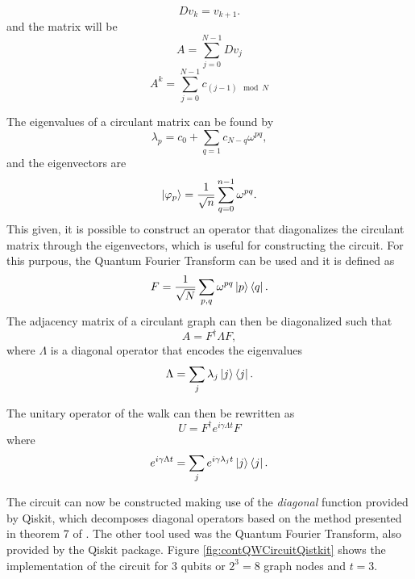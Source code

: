 \documentclass[../../dissertation.tex]{subfiles}
\begin{document}
\begin{equation}
    Dv_k = v_{k+1}.
\end{equation}
and the matrix will be
\begin{equation}
	A = \sum_{j=0}^{N-1} D v_j 
\end{equation}
\begin{equation}
	A^k = \sum_{j=0}^{N-1} c_{(j-1)\mod{N}}
\end{equation}\par
The eigenvalues of a circulant matrix can be found by
\begin{equation}
\lambda_p = c_0 + \sum_{q=1} c_{N-q} \omega^{pq},
\end{equation}
and the eigenvectors are 
\begin{equation}
\ket{\varphi_p} = \frac{1}{\sqrt{n}} \sum_{q=0}^{n-1} \omega^{pq}.
\end{equation}
This given, it is possible to construct an operator that diagonalizes the circulant matrix through the eigenvectors, which is useful for constructing the circuit. For this purpous, the Quantum Fourier Transform can be used and it is defined as 
\begin{equation}
F = \frac{1}{\sqrt{N}} \sum_{p,q} \omega^{pq} \ket{p}\bra{q}.
\end{equation}
The adjacency matrix of a circulant graph can then be diagonalized such that
\begin{equation}
    A = F^{\dagger} \Lambda F,
    \label{eq:qiskitContQWAdj}
\end{equation}
where $\Lambda$ is a diagonal operator that encodes the eigenvalues
\begin{equation}
\Lambda = \sum_{j} \lambda_j \ket{j}\bra{j}.
\end{equation}\par
The unitary operator of the walk can then be rewritten as
\begin{equation}\label{eq:diagUniOpCont}
    U = F^{\dagger}e^{i\gamma \Lambda t} F
\end{equation}
where
\begin{equation}
    e^{i\gamma \Lambda t} = \sum_{j} e^{i\gamma \lambda_j t} \ket{j}\bra{j}.
\end{equation}\par
The circuit can now be constructed making use of the \textit{diagonal} function provided by Qiskit, which decomposes diagonal operators based on the method presented in theorem 7 of \cite{Shende06}. The other tool used was the Quantum Fourier Transform, also provided by the Qiskit package. Figure \ref{fig:contQWCircuitQistkit} shows the implementation of the circuit for 3 qubits or $2^3=8$ graph nodes and $t=3$.
\end{document}
